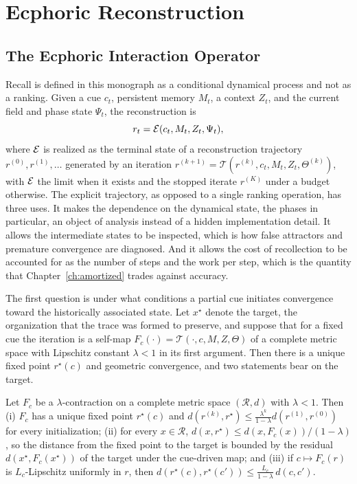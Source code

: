 \part{Ecphoric Reconstruction}

\chapter{The Ecphoric Interaction Operator}\label{ch:ecphoric}

Recall is defined in this monograph as a conditional dynamical process and not as a ranking. Given a cue $c_t$, persistent memory $M_t$, a context $Z_t$, and the current field and phase state $\Psi_t$, the reconstruction is
\begin{equation}\label{eq:ecphoric}
r_t=\mathcal{E}(c_t,M_t,Z_t,\Psi_t),
\end{equation}
where $\mathcal{E}$ is realized as the terminal state of a reconstruction trajectory $r^{(0)},r^{(1)},\dots$ generated by an iteration $r^{(k+1)}=\mathcal T(r^{(k)},c_t,M_t,Z_t,\Theta^{(k)})$, with $\mathcal{E}$ the limit when it exists and the stopped iterate $r^{(K)}$ under a budget otherwise. The explicit trajectory, as opposed to a single ranking operation, has three uses. It makes the dependence on the dynamical state, the phases in particular, an object of analysis instead of a hidden implementation detail. It allows the intermediate states to be inspected, which is how false attractors and premature convergence are diagnosed. And it allows the cost of recollection to be accounted for as the number of steps and the work per step, which is the quantity that Chapter~\ref{ch:amortized} trades against accuracy.

The first question is under what conditions a partial cue initiates convergence toward the historically associated state. Let $x^\star$ denote the target, the organization that the trace was formed to preserve, and suppose that for a fixed cue the iteration is a self-map $F_c(\cdot)=\mathcal T(\cdot,c,M,Z,\Theta)$ of a complete metric space with Lipschitz constant $\lambda<1$ in its first argument. Then there is a unique fixed point $r^\star(c)$ and geometric convergence, and two statements bear on the target.

\begin{theorem}\label{thm:converge}
Let $F_c$ be a $\lambda$-contraction on a complete metric space $(\mathcal R,d)$ with $\lambda<1$. Then (i) $F_c$ has a unique fixed point $r^\star(c)$ and $d(r^{(k)},r^\star)\le\frac{\lambda^k}{1-\lambda}d(r^{(1)},r^{(0)})$ for every initialization; (ii) for every $x\in\mathcal R$, $d(x,r^\star)\le d(x,F_c(x))/(1-\lambda)$, so the distance from the fixed point to the target is bounded by the residual $d(x^\star,F_c(x^\star))$ of the target under the cue-driven map; and (iii) if $c\mapsto F_c(r)$ is $L_c$-Lipschitz uniformly in $r$, then $d(r^\star(c),r^\star(c'))\le\frac{L_c}{1-\lambda}\,d(c,c')$.
\end{theorem}


